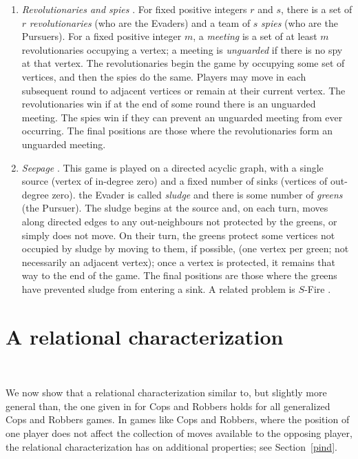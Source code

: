 \documentclass[12pt,reqno]{amsart}
\begin{document}
\begin{enumerate}
\item \emph{Revolutionaries and spies} \cite{butter,mp}. For fixed positive integers $r$ and $s$, there is a set of $r$ \emph{revolutionaries} (who are the Evaders) and a team of $s$ \emph{spies}
    (who are the Pursuers). For a fixed positive integer $m$, a \emph{meeting} is a set of at least $m$ revolutionaries occupying a vertex; a meeting is \emph{unguarded} if there is no spy at that
    vertex. The revolutionaries begin the game by occupying some set of vertices, and then the spies do the same. Players may move in each subsequent round to adjacent vertices or remain at their
    current vertex. The revolutionaries win if at the end of some round there is an unguarded meeting. The spies win if they can prevent an unguarded meeting from ever occurring. The final
    positions are those where the revolutionaries form an unguarded meeting.

\item \emph{Seepage} \cite{bmp,CFFMN}. This game is played on a directed acyclic graph, with a single source (vertex of in-degree zero) and a fixed number of sinks (vertices of out-degree zero).
    the Evader is called \emph{sludge} and there is some number of \emph{greens} (the Pursuer). The sludge begins at the source and, on each turn, moves along directed edges to any out-neighbours
    not protected by the greens, or simply does not move. On their turn, the greens protect some vertices not occupied by sludge by moving to them, if possible, (one vertex per green; not
    necessarily an adjacent vertex); once a vertex is protected, it remains that way to the end of the game.  The final positions are those where the greens have prevented sludge from entering a
    sink.  A related problem is $S$-Fire \cite{FM}.

\end{enumerate}

\section{A relational characterization}~\label{relchar}

We now show that a relational characterization similar to, but slightly more general than, the one given in \cite{NW, cm} for Cops and Robbers
holds for all generalized Cops and Robbers games.
In games like Cops and Robbers, where the position of one player does not affect the collection of moves available to the
opposing player, the
relational characterization has on additional properties; see Section~\ref{pind}.
\end{document}
